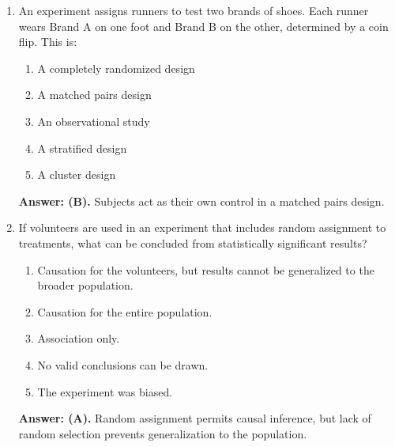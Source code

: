 \begin{enumerate}[leftmargin=1.5em]
  \item An experiment assigns runners to test two brands of shoes. Each runner wears Brand A on one foot and Brand B on the other, determined by a coin flip. This is:
  \begin{enumerate}[label=(\Alph*)]
    \item A completely randomized design \item A matched pairs design \item An observational study \item A stratified design \item A cluster design
  \end{enumerate}
  \textbf{Answer: (B).} Subjects act as their own control in a matched pairs design.

  \item If volunteers are used in an experiment that includes random assignment to treatments, what can be concluded from statistically significant results?
  \begin{enumerate}[label=(\Alph*)]
    \item Causation for the volunteers, but results cannot be generalized to the broader population.
    \item Causation for the entire population.
    \item Association only.
    \item No valid conclusions can be drawn.
    \item The experiment was biased.
  \end{enumerate}
  \textbf{Answer: (A).} Random assignment permits causal inference, but lack of random selection prevents generalization to the population.
\end{enumerate}

